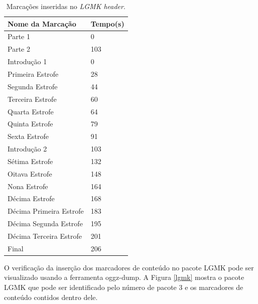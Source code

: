 \begin{table}[ht]
\centering
\caption{Marcações inseridas no \textit{LGMK header}.}
\vspace{0.5cm}
\begin{tabular}{ll}

\hline
\textbf{Nome da Marcação} & \textbf{Tempo(s)} \\
\hline
Parte 1 & 0 \\
Parte 2 & 103 \\
Introdução 1 & 0 \\
Primeira Estrofe & 28 \\
Segunda Estrofe & 44 \\
Terceira Estrofe & 60 \\
Quarta Estrofe & 64 \\
Quinta Estrofe & 79 \\
Sexta Estrofe & 91 \\
Introdução 2 & 103 \\
Sétima Estrofe & 132 \\
Oitava Estrofe & 148 \\
Nona Estrofe & 164 \\
Décima Estrofe & 168 \\
Décima Primeira Estrofe & 183 \\
Décima Segunda Estrofe & 195 \\
Décima Terceira Estrofe & 201 \\
Final & 206 \\
\hline

\end{tabular}
\label{mark}
\end{table}

O verificação da inserção dos marcadores de conteúdo no pacote LGMK pode ser visualizado usando a ferramenta oggz-dump. A Figura \ref{lgmk} mostra o pacote LGMK que pode ser identificado pelo número de pacote 3 e os marcadores de conteúdo contidos dentro dele.

